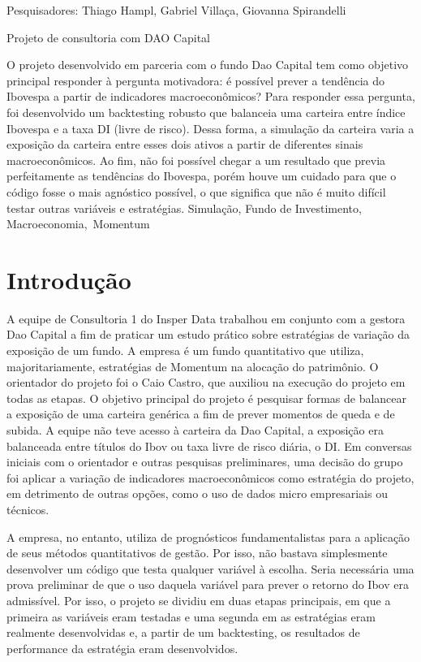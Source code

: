     {
        \noindent Pesquisadores: Thiago Hampl, Gabriel Villaça, Giovanna Spirandelli 

        \noindent Projeto de consultoria com DAO Capital
    }
    {O projeto desenvolvido em parceria com o fundo Dao Capital tem como objetivo principal responder à pergunta motivadora: é possível prever a tendência do Ibovespa a partir de indicadores macroeconômicos? Para responder essa pergunta, foi desenvolvido um backtesting robusto que balanceia uma carteira entre índice Ibovespa e a taxa DI (livre de risco). Dessa forma, a simulação da carteira varia a exposição da carteira entre esses dois ativos a partir de diferentes sinais macroeconômicos. Ao fim, não foi possível chegar a um resultado que previa perfeitamente as tendências do Ibovespa, porém houve um cuidado para que o código fosse o mais agnóstico possível, o que significa que não é muito difícil testar outras variáveis e estratégias. 
    }
    {Simulação, Fundo de Investimento, Macroeconomia, Momentum}
    
\section{Introdução}

A equipe de Consultoria 1 do Insper Data trabalhou em conjunto com a gestora Dao Capital a fim de praticar um estudo prático sobre estratégias de variação da exposição de um fundo. A empresa é um fundo quantitativo que utiliza, majoritariamente, estratégias de Momentum na alocação do patrimônio. O orientador do projeto foi o Caio Castro, que auxiliou na execução do projeto em todas as etapas.
O objetivo principal do projeto é pesquisar formas de balancear a exposição de uma carteira genérica a fim de prever momentos de queda e de subida. A equipe não teve acesso à carteira da Dao Capital, a exposição era balanceada entre títulos do Ibov ou taxa livre de risco diária, o DI. Em conversas iniciais com o orientador e outras pesquisas preliminares, uma decisão do grupo foi aplicar a variação de indicadores macroeconômicos como estratégia do projeto, em detrimento de outras opções, como o uso de dados micro empresariais ou técnicos.

A empresa, no entanto, utiliza de prognósticos fundamentalistas para a aplicação de seus métodos quantitativos de gestão. Por isso, não bastava simplesmente desenvolver um código que testa qualquer variável à escolha. Seria necessária uma prova preliminar de que o uso daquela variável para prever o retorno do Ibov era admissível. Por isso, o projeto se dividiu em duas etapas principais, em que a primeira as variáveis eram testadas e uma segunda em as estratégias eram realmente desenvolvidas e, a partir de um backtesting, os resultados de performance da estratégia eram desenvolvidos. 

